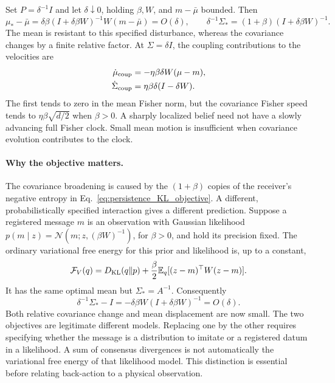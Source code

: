 Set $P=\delta^{-1}I$ and let $\delta\downarrow0$, holding $\beta,W$, and $m-\bar\mu$ bounded. Then
\begin{equation}
 \mu_* -\bar\mu
 =\delta\beta(I+\delta\beta W)^{-1}W(m-\bar\mu)=O(\delta),
 \qquad
 \delta^{-1}\Sigma_*=(1+\beta)(I+\delta\beta W)^{-1}.
 \label{eq:rock_inertia}
\end{equation}
The mean is resistant to this specified disturbance, whereas the covariance changes by a finite relative factor. At $\Sigma=\delta I$, the coupling contributions to the velocities are
\begin{align}
 \dot\mu_{\rm coup}&=-\eta\beta\delta W(\mu-m),\label{eq:rock_back_mu}\\
 \dot\Sigma_{\rm coup}&=\eta\beta\delta(I-\delta W).
 \label{eq:rock_back_sigma}
\end{align}
The first tends to zero in the mean Fisher norm, but the covariance Fisher speed tends to $\eta\beta\sqrt{d/2}$ when $\beta>0$. A sharply localized belief need not have a slowly advancing full Fisher clock. Small mean motion is insufficient when covariance evolution contributes to the clock.

\paragraph{Why the objective matters.}
The covariance broadening is caused by the $(1+\beta)$ copies of the receiver's negative entropy in Eq.~\eqref{eq:persistence_KL_objective}. A different, probabilistically specified interaction gives a different prediction. Suppose a registered message $m$ is an observation with Gaussian likelihood $p(m\mid z)=\mathcal N(m;z,(\beta W)^{-1})$, for $\beta>0$, and hold its precision fixed. The ordinary variational free energy for this prior and likelihood is, up to a constant,
\begin{equation}
 \mathcal F_V(q)=D_{\rm KL}(q\|p)
 +\frac\beta2\mathbb E_q[(z-m)^\top W(z-m)].
 \label{eq:persistence_likelihood_objective}
\end{equation}
It has the same optimal mean but $\Sigma_*=A^{-1}$. Consequently
\begin{equation}
 \delta^{-1}\Sigma_*-I=-\delta\beta W(I+\delta\beta W)^{-1}=O(\delta).
\end{equation}
Both relative covariance change and mean displacement are now small. The two objectives are legitimate different models. Replacing one by the other requires specifying whether the message is a distribution to imitate or a registered datum in a likelihood. A sum of consensus divergences is not automatically the variational free energy of that likelihood model. This distinction is essential before relating back-action to a physical observation.

